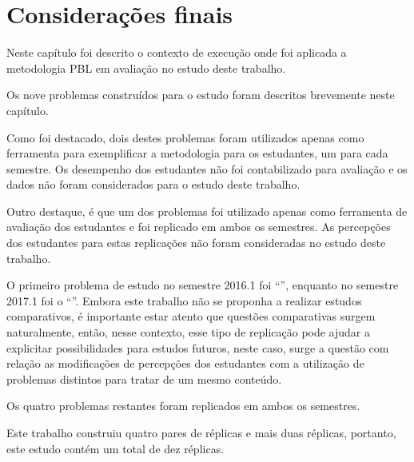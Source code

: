 \section{Considerações finais}
\label{sec-consideracoes-estudo}
Neste capítulo foi descrito o contexto de execução onde foi aplicada a
metodologia PBL em avaliação no estudo deste trabalho.

Os nove problemas construídos para o estudo foram descritos brevemente neste capítulo.

Como foi destacado, dois destes problemas foram utilizados
apenas como ferramenta para exemplificar a metodologia para os estudantes,
um para cada semestre.
Os desempenho dos estudantes não foi contabilizado para avaliação
e os dados não foram considerados para o estudo deste trabalho.

Outro destaque, é que um dos problemas foi utilizado apenas como ferramenta
de avaliação dos estudantes e foi replicado em ambos os semestres.
As percepções dos estudantes para estas replicações não foram
consideradas no estudo deste trabalho.

O primeiro problema de estudo no semestre 2016.1 foi ``\ProblemaA'', enquanto no
semestre 2017.1 foi o ``\ProblemaG''.
Embora este trabalho não se proponha a realizar estudos comparativos, é importante
estar atento que questões comparativas surgem naturalmente, então, nesse contexto,
esse tipo de replicação pode ajudar a explicitar possibilidades para
estudos futuros, neste caso, surge a questão com relação as modificações de
percepções dos estudantes com a utilização de problemas distintos
para tratar de um mesmo conteúdo.

Os quatro problemas restantes foram replicados em ambos os semestres.

Este trabalho construiu quatro pares de réplicas e mais duas
réplicas, portanto, este estudo contém um total de dez
réplicas.
